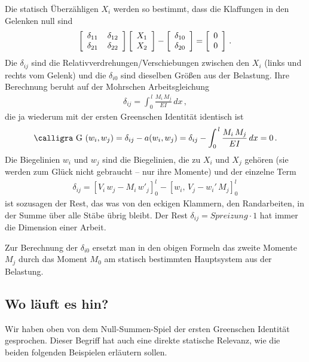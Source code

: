 {{{{{Die statisch \"{U}berz\"{a}hligen $X_i$ werden so bestimmt, dass die Klaffungen in den Gelenken null sind
\begin{align}
\left[ \barr {r @{\hspace{4mm}}r} \delta_{11} & \delta_{12} \\ \delta_{21} & \delta_{22} \earr \right] \left[ \barr {r } X_1 \\ X_2 \earr \right] -  \left[ \barr {r } \delta_{10} \\ \delta_{20} \earr \right] = \left[ \barr {r } 0 \\ 0 \earr \right] \,.
\end{align}
Die $\delta_{ij}$ sind die Relativverdrehungen/Verschiebungen zwischen den $X_i$ (links und rechts vom Gelenk) und die $\delta_{i0}$ sind dieselben Gr\"{o}{\ss}en aus der Belastung. Ihre Berechnung beruht auf der Mohrschen Arbeitsgleichung
\begin{align}
\delta_{ij} = \int_0^{\,l} \frac{M_i\,M_j}{EI}\,dx\,,
\end{align}
die ja wiederum mit der ersten Greenschen Identit\"{a}t identisch ist
\begin{align}
\text{\normalfont\calligra G\,\,}(w_i,w_j) = \delta_{ij} - a(w_i,w_j) = \delta_{ij}  - \int_0^{\,l}\frac{M_i\,M_j}{EI}\,dx = 0\,.
\end{align}
Die Biegelinien $w_i$ und $w_j$ sind die Biegelinien, die zu $X_i$ und $X_j$ geh\"{o}ren (sie werden zum Gl\"{u}ck nicht gebraucht -- nur ihre Momente) und der einzelne Term
\begin{align}
\delta_{ij} = [V_i\,w_j - M_i\,w'_j]_0^l - [w_i,\,V_j - w_i'\,M_j]_0^l
\end{align}
ist sozusagen der \glq Rest\grq{}, das was von den eckigen Klammern, den Randarbeiten, in der Summe \"{u}ber alle St\"{a}be \"{u}brig bleibt. Der Rest $\delta_{ij} = Spreizung \cdot 1$ hat immer die Dimension einer Arbeit.

Zur Berechnung der $\delta_{i0}$ ersetzt man in den obigen Formeln das zweite Momente $M_j$ durch das Moment $M_0$ am statisch bestimmten Hauptsystem aus der Belastung.

\textcolor{sectionTitleBlue}{\section{Wo l\"{a}uft es hin?}}
Wir haben oben von dem Null-Summen-Spiel der ersten Greenschen Identit\"{a}t gesprochen. Dieser Begriff hat auch eine direkte statische Relevanz, wie die beiden folgenden Beispielen erl\"{a}utern sollen.

}}}}}

